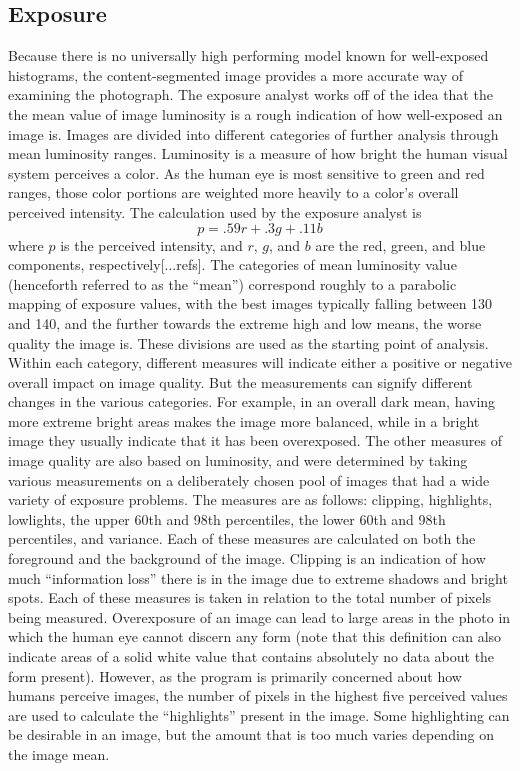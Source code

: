 \documentclass[twocolumn]{article}
\begin{document}
\subsection{Exposure}
Because there is no universally high performing model known for well-exposed histograms, the content-segmented image provides a more accurate way of examining the photograph. The exposure analyst works off of the idea that the the mean value of image luminosity is a rough indication of how well-exposed an image is. Images are divided into different categories of further analysis through mean luminosity ranges.
Luminosity is a measure of how bright the human visual system perceives a color. As the human eye is most sensitive to green and red ranges, those color portions are weighted more heavily to a color's overall perceived intensity. The calculation used by the exposure analyst is
\[
p=.59r+.3g+.11b
\]
where \(p\) is the perceived intensity, and \(r\), \(g\), and \(b\) are the red, green, and blue components, respectively[...refs].
The categories of mean luminosity value (henceforth referred to as the “mean”) correspond roughly to a parabolic mapping of exposure values, with the best images typically falling between 130 and 140, and the further towards the extreme high and low means, the worse quality the image is. These divisions are used as the starting point of analysis. Within each category, different measures will indicate either a positive or negative overall impact on image quality. But the measurements can signify different changes in the various categories. For example, in an overall dark mean, having more extreme bright areas makes the image more balanced, while in a bright image they usually indicate that it has been overexposed.
The other measures of image quality are also based on luminosity, and were determined by taking various measurements on a deliberately chosen pool of images that had a wide variety of exposure problems. The measures are as follows: clipping, highlights, lowlights, the upper 60th and 98th percentiles, the lower 60th and 98th percentiles, and variance. Each of these measures are calculated on both the foreground and the background of the image.
Clipping is an indication of how much “information loss” there is in the image due to extreme shadows and bright spots. Each of these measures is taken in relation to the total number of pixels being measured.
Overexposure of an image can lead to large areas in the photo in which the human eye cannot discern any form (note that this definition can also indicate areas of a solid white value that contains absolutely no data about the form present). However, as the program is primarily concerned about how humans perceive images, the number of pixels in the highest five perceived values are used to calculate the “highlights” present in the image. Some highlighting can be desirable in an image, but the amount that is too much varies depending on the image mean.
\end{document}

